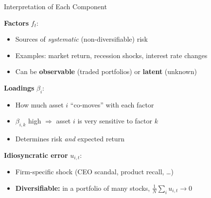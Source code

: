 \documentclass[aspectratio=169]{beamer}
\begin{document}
%
%
\begin{frame}{Interpretation of Each Component}

\textbf{Factors} $f_t$:
\begin{itemize}
    \item Sources of \emph{systematic} (non-diversifiable) risk
    \item Examples: market return, recession shocks, interest rate changes
    \item Can be \textbf{observable} (traded portfolios) or \textbf{latent} (unknown)
\end{itemize}

\vspace{0.5em}
\textbf{Loadings} $\beta_i$:
\begin{itemize}
    \item How much asset $i$ ``co-moves'' with each factor
    \item $\beta_{i,k}$ high $\Rightarrow$ asset $i$ is very sensitive to factor $k$
    \item Determines risk \emph{and} expected return
\end{itemize}

\vspace{0.5em}
\textbf{Idiosyncratic error} $u_{i,t}$:
\begin{itemize}
    \item Firm-specific shock (CEO scandal, product recall, \ldots)
    \item \textbf{Diversifiable:} in a portfolio of many stocks, $\frac{1}{N}\sum_i u_{i,t} \to 0$
\end{itemize}

\end{frame}
%
%
\end{document}
